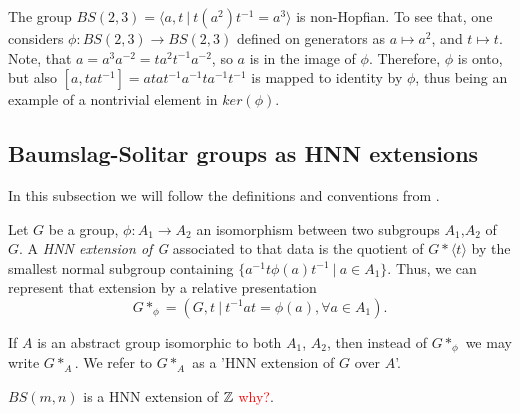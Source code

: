 \begin{importantexample}\cite[page 514]{BrHa11}
    The group $BS(2,3) = \langle a,t \: | \: t(a^2)t^{-1} = a^3\rangle $ is non-Hopfian. To see that, one considers $\phi: BS(2,3) \to BS(2,3)$ defined on generators as $a \mapsto a^2$, and $t \mapsto t$. Note, that $a = a^3a^{-2} = ta^2t^{-1}a^{-2}$, so $a$ is in the image of $\phi$. Therefore, $\phi$ is onto, but also $[a,tat^{-1}] = atat^{-1}a^{-1}ta^{-1}t^{-1}$ is mapped to identity by $\phi$, thus being an example of a nontrivial element in $ker(\phi)$.
\end{importantexample}

\subsection{Baumslag-Solitar groups as HNN extensions}

In this subsection we will follow the definitions and conventions from \cite[pages 497-498]{BrHa11}.

\begin{definition}
\label{HNN}
    Let $G$ be a group, $\phi: A_1 \to A_2$ an isomorphism between two subgroups $A_1$,$A_2$ of $G$. A \emph{HNN extension of G} associated to that data is the quotient of $G \ast \langle t \rangle$ by the smallest normal subgroup containing $\{a^{-1}t\phi(a)t^{-1} \: | \: a \in A_1 \}$. Thus, we can represent that extension by a relative presentation 
    \[G \ast_\phi = ( G,t \: | \: t^{-1}at = \phi(a), \forall a \in A_1). \]
\end{definition}

\begin{remark}
    If $A$ is an abstract group isomorphic to both $A_1$, $A_2$, then instead of $G \ast _\phi$ we may write $G \ast _A$. We refer to $G \ast _A$ as a 'HNN extension of $G$ over $A$'.
\end{remark}

\begin{example}
    $BS(m,n)$ is a HNN extension of $\mathbb{Z}$ \textcolor{red}{why?}.
\end{example}







